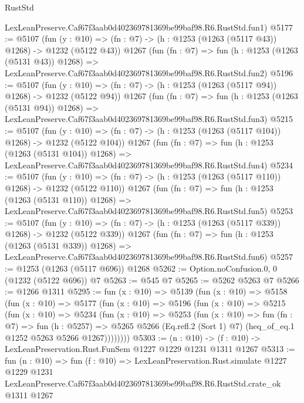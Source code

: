 \begin{lexlean}{RustStd}
\begin{coremodule}
    LexLeanPreserve.Caf67f3aab0d402369781369be99baf98.R6.RustStd.fun1)
@5177 := @5107
    (fun (y : @10) => (fn : @7) -> (h : @1253 (@1263 (@5117 @43)) @1268) -> @1232 (@5122 @43))
    @1267
    (fun (fn : @7) =>
    fun (h : @1253 (@1263 (@5131 @43)) @1268) =>
    LexLeanPreserve.Caf67f3aab0d402369781369be99baf98.R6.RustStd.fun2)
@5196 := @5107
    (fun (y : @10) => (fn : @7) -> (h : @1253 (@1263 (@5117 @94)) @1268) -> @1232 (@5122 @94))
    @1267
    (fun (fn : @7) =>
    fun (h : @1253 (@1263 (@5131 @94)) @1268) =>
    LexLeanPreserve.Caf67f3aab0d402369781369be99baf98.R6.RustStd.fun3)
@5215 := @5107
    (fun (y : @10) => (fn : @7) -> (h : @1253 (@1263 (@5117 @104)) @1268) -> @1232 (@5122 @104))
    @1267
    (fun (fn : @7) =>
    fun (h : @1253 (@1263 (@5131 @104)) @1268) =>
    LexLeanPreserve.Caf67f3aab0d402369781369be99baf98.R6.RustStd.fun4)
@5234 := @5107
    (fun (y : @10) => (fn : @7) -> (h : @1253 (@1263 (@5117 @110)) @1268) -> @1232 (@5122 @110))
    @1267
    (fun (fn : @7) =>
    fun (h : @1253 (@1263 (@5131 @110)) @1268) =>
    LexLeanPreserve.Caf67f3aab0d402369781369be99baf98.R6.RustStd.fun5)
@5253 := @5107
    (fun (y : @10) => (fn : @7) -> (h : @1253 (@1263 (@5117 @339)) @1268) -> @1232 (@5122 @339))
    @1267
    (fun (fn : @7) =>
    fun (h : @1253 (@1263 (@5131 @339)) @1268) =>
    LexLeanPreserve.Caf67f3aab0d402369781369be99baf98.R6.RustStd.fun6)
@5257 := @1253 (@1263 (@5117 @696)) @1268
@5262 := Option.noConfusion.{0, 0} (@1232 (@5122 @696)) @7
@5263 := @545 @7
@5265 := @5262 @5263 @7
@5266 := @1266 @1311
@5295 := fun (x : @10) =>
  @5139
    (fun (x : @10) =>
    @5158
      (fun (x : @10) =>
      @5177
        (fun (x : @10) =>
        @5196
          (fun (x : @10) =>
          @5215
            (fun (x : @10) =>
            @5234
              (fun (x : @10) =>
              @5253
                (fun (x : @10) =>
                fun (fn : @7) =>
                fun (h : @5257) =>
                @5265 @5266 (Eq.refl.{2} (Sort 1) @7) (heq_of_eq.{1} @1252 @5263 @5266 @1267))))))))
@5303 := (n : @10) -> (f : @10) -> LexLeanPreservation.Rust.FunSem @1227 @1229 @1231 @1311 @1267
@5313 := fun (n : @10) =>
  fun (f : @10) =>
  LexLeanPreservation.Rust.simulate
    @1227
    @1229
    @1231
    LexLeanPreserve.Caf67f3aab0d402369781369be99baf98.R6.RustStd.crate_ok
    @1311
    @1267
\end{coremodule}
\end{lexlean}
